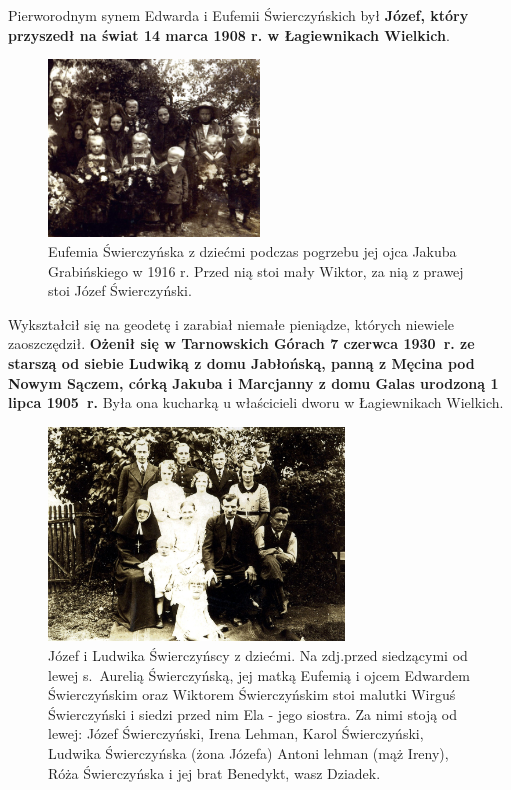 Pierworodnym synem Edwarda i Eufemii Świerczyńskich był \textbf{Józef, który przyszedł na świat 14 marca 1908 r. w Łagiewnikach Wielkich}.

\begin{figure}[!h]
\begin{center}
\includegraphics[width=0.5\textwidth]{photo/eufemia_swierczynska_z_dziecmi.jpg}
\caption[Eufemia Świerczyńska z dziećmi podczas pogrzebu jej ojca Jakuba Grabińskiego w 1916 r.]{Eufemia Świerczyńska z dziećmi podczas pogrzebu jej ojca Jakuba Grabińskiego w 1916 r. Przed nią stoi mały Wiktor, za nią z prawej stoi Józef Świerczyński.}
\label{rys:eufemia_swierczynska_z_dziecmi}
\end{center}
\end{figure}

Wykształcił się na geodetę i zarabiał niemałe pieniądze, których niewiele zaoszczędził. \textbf{Ożenił się w Tarnowskich Górach 7 czerwca 1930~r.  ze starszą od siebie Ludwiką z domu Jabłońską, panną z Męcina pod Nowym Sączem, córką Jakuba i Marcjanny z domu Galas urodzoną 1 lipca 1905~r.} Była ona kucharką u właścicieli dworu w Łagiewnikach Wielkich.

\begin{figure}[!h]
\begin{center}
\includegraphics[width=0.7\textwidth]{photo/jozef_ludwika_swierczynscy_z_dziecmi.jpg}
\caption[Józef i Ludwika Świerczyńscy z dziećmi]{Józef i Ludwika Świerczyńscy z dziećmi. Na zdj.przed siedzącymi od lewej s.~Aurelią Świerczyńską, jej matką Eufemią i ojcem Edwardem Świerczyńskim oraz Wiktorem Świerczyńskim stoi malutki Wirguś Świerczyński i siedzi przed nim Ela - jego siostra. Za nimi stoją od lewej: Józef Świerczyński, Irena Lehman, Karol Świerczyński, Ludwika Świerczyńska (żona Józefa) Antoni lehman (mąż Ireny), Róża Świerczyńska i jej brat Benedykt, wasz Dziadek.}
\label{rys:jozef_ludwika_swierczynscy_z_dziecmi}
\end{center}
\end{figure}

